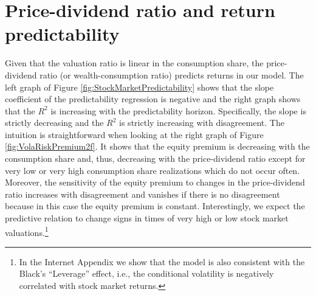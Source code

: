 \section{Price-dividend ratio and return predictability}
 Given that the valuation ratio is linear in the consumption share, the price-dividend ratio (or wealth-consumption ratio) predicts returns in our model. The left graph of Figure \ref{fig:StockMarketPredictability} shows that the slope coefficient of the predictability regression is negative and the right graph shows that the $R^2$ is increasing with the predictability horizon. Specifically, the slope is strictly decreasing and the $R^2$ is strictly increasing with disagreement. The intuition is straightforward when looking at the right graph of Figure \ref{fig:VolaRiskPremium2f}. It shows that the equity premium is decreasing with the consumption share and, thus, decreasing with the price-dividend ratio except for very low or very high consumption share realizations which do not occur often.  Moreover, the sensitivity of the equity premium to changes in the price-dividend ratio increases with disagreement and vanishes if there is no disagreement because in this case the equity premium is constant.  Interestingly, we expect the predictive relation to change signs in times of very high or low stock market valuations.\footnote{In the Internet Appendix we show that the model is also consistent with the Black's ``Leverage'' effect, i.e., the conditional volatility is negatively correlated with stock market returns.}

